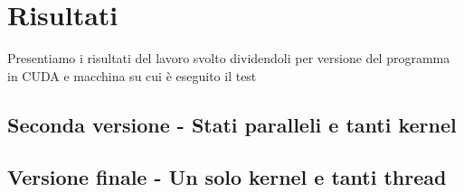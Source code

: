 \chapter{Risultati}

Presentiamo i risultati del lavoro svolto dividendoli per versione del programma in CUDA e macchina su cui è eseguito il test

\section{Seconda versione - Stati paralleli e tanti kernel}

\section{Versione finale - Un solo kernel e tanti thread}